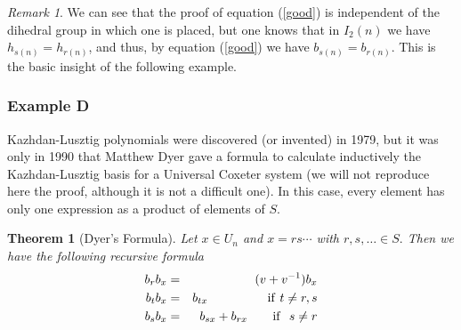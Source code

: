 \documentclass[12pt]{wart}
\newtheorem{thm}{Theorem}[section]
\theoremstyle{remark}
\newtheorem{remark}{Remark}
\begin{document}
\begin{remark}\label{univ}
We can see that the  proof of equation (\ref{good}) is independent of the dihedral group in which one is placed, but one knows that in $I_2(n)$ we have  $h_{s(n)}=h_{r(n)}$, and thus, by equation (\ref{good}) we have $b_{s(n)}=b_{r(n)}$. This is the basic insight of the following example. 
\end{remark}









\subsubsection{Example D}  
Kazhdan-Lusztig polynomials were discovered (or invented) in 1979, but it was only in 1990 that Matthew Dyer gave a formula  \cite{Dy} to calculate inductively the Kazhdan-Lusztig basis for a Universal Coxeter system (we will not reproduce here the proof, although it is not a difficult one). In this case, every element has only one expression as a product of elements of $S$. 




\begin{thm}[Dyer's Formula]\label{Dy} Let $x\in U_n$ and $x=rs\cdots $ with $r,s, \ldots \in S.$ Then we have the following recursive formula
\begin{eqnarray}\label{universal}
b_rb_x  & = & (v+v^{-1})b_x \nonumber\\ 
b_tb_x&=&b_{tx}\hspace{1.7cm} \mathrm{if} \ t\neq r,s \nonumber \\
b_sb_x &=&b_{sx}+b_{rx}\ \hspace{.6cm}  \mathrm{if}\ \ s\neq r 
\end{eqnarray}
\end{thm}



















\end{document}
